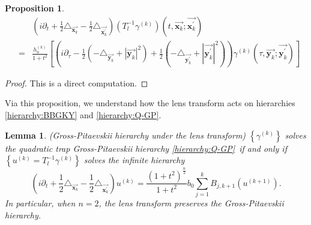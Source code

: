\documentclass[reqno]{amsart}
\theoremstyle{plain}
\newtheorem{lemma}{Lemma}
\newtheorem{proposition}{Proposition}
\numberwithin{equation}{section}
\begin{document}
\begin{proposition}
\label{Proposition:LensTransformRelation}\begin{eqnarray*}
&&\left( i\partial _{t}+\frac{1}{2}\triangle _{\overrightarrow{\mathbf{x}_{k}}}-\frac{1}{2}\triangle _{\overrightarrow{\mathbf{x}_{k}^{\prime }}}\right)
\left( T_{l}^{-1}\gamma ^{(k)}\right) (t,\overrightarrow{\mathbf{x}_{k}};\overrightarrow{\mathbf{x}_{k}^{\prime }}) \\
&=&\frac{h_{n}^{(k)}}{1+t^{2}}\left[ \left( i\partial _{\tau }-\frac{1}{2}\left( -\triangle _{\overrightarrow{\mathbf{y}_{k}}}+\left\vert 
\overrightarrow{\mathbf{y}_{k}}\right\vert ^{2}\right) +\frac{1}{2}\left(
-\triangle _{\overrightarrow{\mathbf{y}_{k}^{\prime }}}+\left\vert 
\overrightarrow{\mathbf{y}_{k}^{\prime }}\right\vert ^{2}\right) \right)
\gamma ^{(k)}(\tau ,\overrightarrow{\mathbf{y}_{k}};\overrightarrow{\mathbf{y}_{k}^{\prime }})\right]
\end{eqnarray*}
\end{proposition}

\begin{proof}
This is a direct computation.
\end{proof}

Via this proposition, we understand how the lens transform acts on
hierarchies \ref{hierarchy:BBGKY} and \ref{hierarchy:Q-GP}.

\begin{lemma}
\label{Lemma:Q-GPUnderLens}(Gross-Pitaevskii hierarchy under the lens
transform) $\left\{ \gamma ^{(k)}\right\} $ solves the quadratic trap
Gross-Pitaevskii hierarchy \ref{hierarchy:Q-GP}\ if and only if $\left\{
u^{(k)}=T_{l}^{-1}\gamma ^{(k)}\right\} $ solves the infinite hierarchy\begin{equation}
\left( i\partial _{t}+\frac{1}{2}\triangle _{\overrightarrow{\mathbf{x}_{k}}}-\frac{1}{2}\triangle _{\overrightarrow{\mathbf{x}_{k}^{\prime }}}\right)
u^{(k)}=\frac{\left( 1+t^{2}\right) ^{\frac{n}{2}}}{1+t^{2}}b_{0}\sum_{j=1}^{k}B_{j,k+1}\left( u^{(k+1)}\right) .
\label{hierarchy:Q-GP after Lens transform}
\end{equation}In particular, when $n=2$, the lens transform preserves the Gross-Pitaevskii
hierarchy.
\end{lemma}
\end{document}
